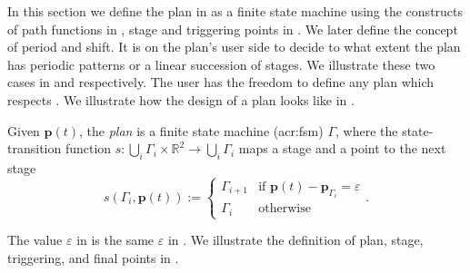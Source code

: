 In this section we define the plan in  as a finite state machine using the constructs of path functions in , stage and triggering points in . We later define the concept of period and shift. It is on the plan's user side to decide to what extent the plan has periodic patterns or a linear succession of stages. We illustrate these two cases in  and  respectively. The user has the freedom to define any plan which respects . We illustrate how the design of a plan looks like in . 

\begin{highlight}  
  \begin{defn}[Plan]\label{def:plan}
    Given $\mathbf{p}(t)$, the \emph{plan} is a finite state machine (\Gls{acr:fsm}) $\Gamma$, where the state-transition function $s:\bigcup_i{\Gamma_i}\times\mathbb{R}^2\rightarrow\bigcup_i{\Gamma_i}$ maps a stage and a point to the next stage
    \begin{equation*}s(\Gamma_i,\mathbf{p}(t)):=\begin{cases}
      \Gamma_{i+1} & \text{if }\mathbf{p}(t)-\mathbf{p}_{\Gamma_i}=\varepsilon\\
      \Gamma_i & \text{otherwise}
    \end{cases}.\end{equation*}
  \end{defn}
\end{highlight}

The value $\varepsilon$ in  is the same $\varepsilon$ in . We illustrate the definition of plan, stage, triggering, and final points in .

